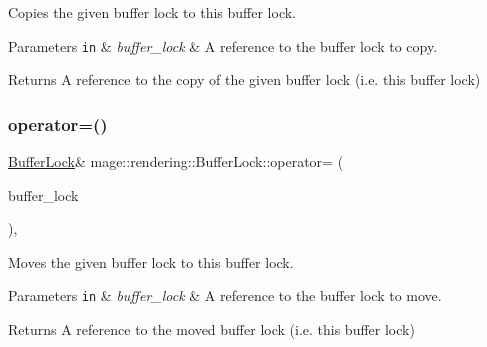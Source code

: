 Copies the given buffer lock to this buffer lock.


\begin{DoxyParams}[1]{Parameters}
\mbox{\tt in}  & {\em buffer\+\_\+lock} & A reference to the buffer lock to copy. \\
\hline
\end{DoxyParams}
\begin{DoxyReturn}{Returns}
A reference to the copy of the given buffer lock (i.\+e. this buffer lock) 
\end{DoxyReturn}
\hypertarget{classmage_1_1rendering_1_1_buffer_lock_a625ec83f70daddaedc2cb0533b982c74}{}\label{classmage_1_1rendering_1_1_buffer_lock_a625ec83f70daddaedc2cb0533b982c74} 
\subsubsection{\texorpdfstring{operator=()}{operator=()}\hspace{0.1cm}{\footnotesize\ttfamily [2/2]}}
{\footnotesize\ttfamily \hyperlink{classmage_1_1rendering_1_1_buffer_lock}{Buffer\+Lock}\& mage\+::rendering\+::\+Buffer\+Lock\+::operator= (\begin{DoxyParamCaption}\item[{\hyperlink{classmage_1_1rendering_1_1_buffer_lock}{Buffer\+Lock} \&\&}]{buffer\+\_\+lock }\end{DoxyParamCaption})\hspace{0.3cm}{\ttfamily [default]}, {\ttfamily [noexcept]}}

Moves the given buffer lock to this buffer lock.


\begin{DoxyParams}[1]{Parameters}
\mbox{\tt in}  & {\em buffer\+\_\+lock} & A reference to the buffer lock to move. \\
\hline
\end{DoxyParams}
\begin{DoxyReturn}{Returns}
A reference to the moved buffer lock (i.\+e. this buffer lock) 
\end{DoxyReturn}
\hypertarget{classmage_1_1rendering_1_1_buffer_lock_a19ebd740876eea3b7d418bef505c47d7}{}\label{classmage_1_1rendering_1_1_buffer_lock_a19ebd740876eea3b7d418bef505c47d7} 
